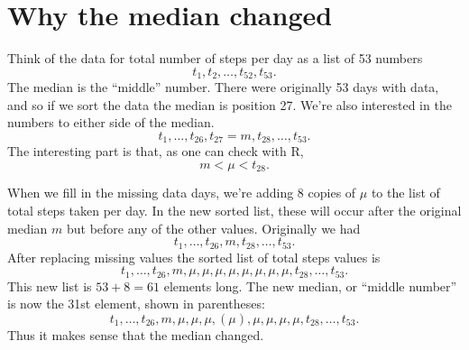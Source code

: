 \documentclass{article}
\begin{document}
\section{Why the median changed}

Think of the data for total number of steps per day as a list of 53 numbers
$$t_1, t_2, \dots, t_{52}, t_{53}.$$
The median is the ``middle'' number. There were originally 53 days with data, and so if we sort the data the median is position 27.  We're also interested in the numbers to either side of the median.
$$ t_1, \dots, t_{26}, t_{27}=m, t_{28}, \dots, t_{53}.$$
The interesting part is that, as one can check with R, 
$$m < \mu < t_{28}.$$

When we fill in the missing data days, we're adding 8 copies of $\mu$ to the list of total steps taken per day.  In the new sorted list, these will occur 
after the original median $m$ but before any of the other values. Originally we had
$$ t_1, \dots, t_{26}, m, t_{28}, \dots, t_{53}.$$
After replacing missing values the sorted list of total steps values is 
$$ t_1, \dots, t_{26}, m, \mu, \mu, \mu, \mu, \mu, \mu, \mu, \mu, t_{28}, \dots, t_{53}.$$
This new list is $53+8=61$ elements long. The new median, or ``middle number'' is now the 31st element,  shown in parentheses:
$$ t_1, \dots, t_{26}, m, \mu, \mu, \mu, \left(\mu\right), \mu, \mu, \mu, \mu, t_{28}, \dots, t_{53}.$$
Thus it makes sense that the median changed.
\end{document}
